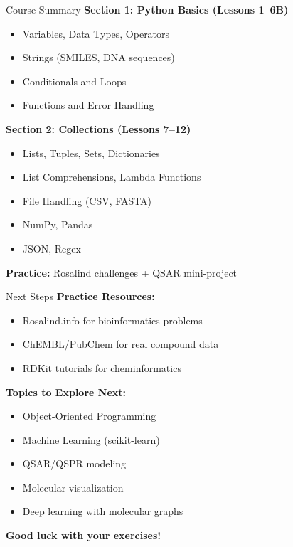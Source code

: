 \documentclass{beamer}
\begin{document}
\begin{frame}{Course Summary}
    \footnotesize
    \textbf{Section 1: Python Basics (Lessons 1--6B)}
    \begin{itemize}\setlength{\itemsep}{0pt}
        \item Variables, Data Types, Operators
        \item Strings (SMILES, DNA sequences)
        \item Conditionals and Loops
        \item Functions and Error Handling
    \end{itemize}
    \vspace{0.3em}
    \textbf{Section 2: Collections (Lessons 7--12)}
    \begin{itemize}\setlength{\itemsep}{0pt}
        \item Lists, Tuples, Sets, Dictionaries
        \item List Comprehensions, Lambda Functions
        \item File Handling (CSV, FASTA)
        \item NumPy, Pandas
        \item JSON, Regex
    \end{itemize}
    \vspace{0.3em}
    \textbf{Practice:} Rosalind challenges + QSAR mini-project
\end{frame}

\begin{frame}{Next Steps}
    \footnotesize
    \textbf{Practice Resources:}
    \begin{itemize}\setlength{\itemsep}{0pt}
        \item Rosalind.info for bioinformatics problems
        \item ChEMBL/PubChem for real compound data
        \item RDKit tutorials for cheminformatics
    \end{itemize}
    \vspace{0.3em}
    \textbf{Topics to Explore Next:}
    \begin{itemize}\setlength{\itemsep}{0pt}
        \item Object-Oriented Programming
        \item Machine Learning (scikit-learn)
        \item QSAR/QSPR modeling
        \item Molecular visualization
        \item Deep learning with molecular graphs
    \end{itemize}
    \vspace{0.5em}
    \centering
    \textbf{\Large Good luck with your exercises!}
\end{frame}
\end{document}
